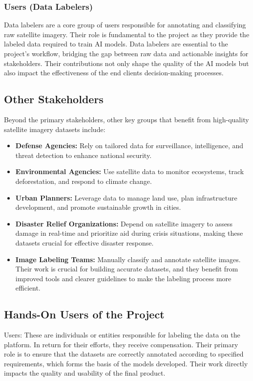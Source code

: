 \documentclass[12pt]{article}
\begin{document}
\subsubsection{Users (Data Labelers)}
Data labelers are a core group of users responsible for annotating and classifying raw satellite imagery. Their role is fundamental to the project as they provide the labeled data required to train AI models. Data labelers are essential to the project's workflow, bridging the gap between raw data and actionable insights for stakeholders. Their contributions not only shape the quality of the AI models but also impact the effectiveness of the end clients decision-making processes.


\subsection{Other Stakeholders}
Beyond the primary stakeholders, other key groups that benefit from high-quality satellite imagery datasets include:
\begin{itemize}[leftmargin=2cm]
    \item \textbf{Defense Agencies:} Rely on tailored data for surveillance, intelligence, and threat detection to enhance national security.
    \item \textbf{Environmental Agencies:} Use satellite data to monitor ecosystems, track deforestation, and respond to climate change.
    \item \textbf{Urban Planners:} Leverage data to manage land use, plan infrastructure development, and promote sustainable growth in cities.
    \item \textbf{Disaster Relief Organizations:} Depend on satellite imagery to assess damage in real-time and prioritize aid during crisis situations, making these datasets crucial for effective disaster response.
    \item \textbf{Image Labeling Teams:} Manually classify and annotate satellite images. Their work is crucial for building accurate datasets, and they benefit from improved tools and clearer guidelines to make the labeling process more efficient.
\end{itemize}

\subsection{Hands-On Users of the Project}
Users: These are individuals or entities responsible for labeling the data on the platform. In return for their efforts, they receive compensation. Their primary role is to ensure that the datasets are correctly annotated according to specified requirements, which forms the basis of the models developed. Their work directly impacts the quality and usability of the final product.
\end{document}
